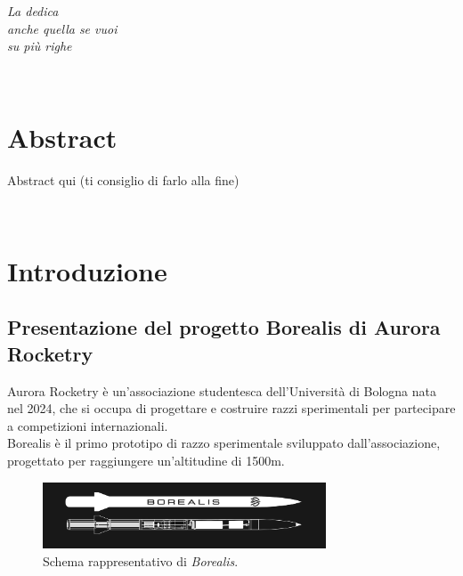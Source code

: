 \documentclass[12pt,a4paper,twoside]{book}
\begin{document}

\ifdefined\HCode
\else
    \topmargin=5.5cm
    \begin{flushright}
        \emph{
            \LARGE{La dedica}\\\vspace{3mm}
            \LARGE{anche quella se vuoi}\\\vspace{3mm}
            \LARGE{su più righe}
        }
    \end{flushright}
\fi
\newpage~\newpage
{}
\chapter*{Abstract}
Abstract qui (ti consiglio di farlo alla fine)

\topmargin=-1cm
\tableofcontents
\thispagestyle{empty}
\listoftables
\thispagestyle{empty}
\listoffigures
\thispagestyle{empty}
\newpage~\newpage


\setcounter{chapter}{0}
\raggedbottom
\chapter{Introduzione} \label{chap:intro}
\pagestyle{plain}
\setcounter{page}{1}

\section{Presentazione del progetto Borealis di Aurora Rocketry}
Aurora Rocketry è un'associazione studentesca dell'Università di Bologna nata
nel 2024, che si occupa di progettare e costruire razzi sperimentali per
partecipare a competizioni internazionali. \\
Borealis è il primo prototipo di razzo sperimentale sviluppato
dall'associazione, progettato per raggiungere un'altitudine di 1500m.

\begin{figure}[H]
    \centering
    \includegraphics[width=0.75\textwidth]{img/borealis-schema.png}
    \caption{Schema rappresentativo di \emph{Borealis}.}
    \label{fig:borealis-schema}
\end{figure}
\end{document}
